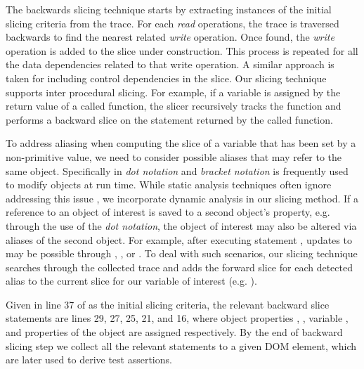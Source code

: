 The backwards slicing technique starts by extracting instances of the initial slicing criteria from the trace. For each \textit{read} operations, the trace is traversed backwards to find the nearest related \textit{write} operation. Once found, the \textit{write} operation is added to the slice under construction. This process is repeated for all the data dependencies related to that write operation. A similar approach is taken for including control dependencies in the slice. 
Our slicing technique supports inter procedural slicing. For example, if a variable is assigned by the return value of a called function, the slicer recursively tracks the function and performs a backward slice on the statement returned by the called function. 

To address aliasing when computing the slice of a variable that has been set by a non-primitive value, we need to consider possible aliases that may refer to the same object. Specifically in \javascript \textit{dot notation} and \textit{bracket notation} is frequently used to modify objects at run time. While static analysis techniques often ignore addressing this issue \cite{Feldthaus:icse13}, we incorporate dynamic analysis in our slicing method. If a reference to an object of interest is saved to a second object's property, e.g. through the use of the \textit{dot notation}, the object of interest may also be altered via aliases of the second object. For example, after executing statement , updates to  may be possible through , , or . To deal with such scenarios, our slicing technique searches through the collected trace and adds the forward slice for each detected alias to the current slice for our variable of interest (e.g. ). 

Given  in line 37 of  as the initial slicing criteria, the relevant backward slice statements are lines 29, 27, 25, 21, and 16, where object properties , , variable , and properties of the object  are assigned respectively.
By the end of backward slicing step we collect all the relevant statements to a given DOM element, which are later used to derive test assertions.    